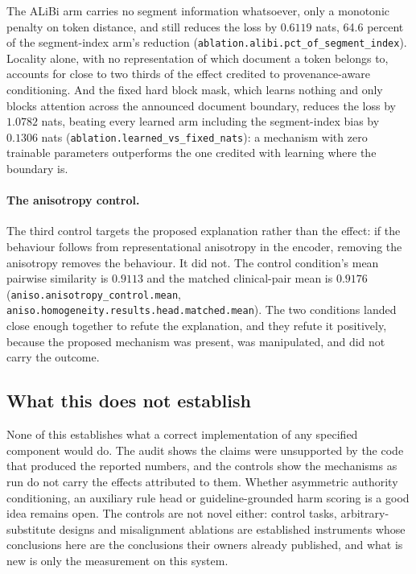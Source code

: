 The ALiBi arm carries no segment information whatsoever, only a monotonic penalty on token
distance, and still reduces the loss by $0.6119$ nats, 64.6 percent of the segment-index arm's
reduction (\texttt{ablation.alibi.pct\_of\_segment\_index}). Locality alone, with no representation
of which document a token belongs to, accounts for close to two thirds of the effect credited to
provenance-aware conditioning. And the fixed hard block mask, which learns nothing and only blocks
attention across the announced document boundary, reduces the loss by $1.0782$ nats, beating every
learned arm including the segment-index bias by $0.1306$ nats
(\texttt{ablation.learned\_vs\_fixed\_nats}): a mechanism with zero trainable parameters outperforms
the one credited with learning where the boundary is.

\paragraph{The anisotropy control.} The third control targets the proposed
explanation rather than the effect: if the behaviour follows from
representational anisotropy in the encoder, removing the anisotropy removes the
behaviour. It did not. The control condition's mean pairwise similarity is
$0.9113$ and the matched clinical-pair mean is $0.9176$
(\texttt{aniso.anisotropy\_control.mean},
\texttt{aniso.homogeneity.results.head.matched.mean}). The two conditions
landed close enough together to refute the explanation, and they refute it
positively, because the proposed mechanism
was present, was manipulated, and did not carry the outcome.

\subsection{What this does not establish}

None of this establishes what a correct implementation of any specified component
would do. The audit shows the claims were unsupported by the code that produced
the reported numbers, and the controls show the mechanisms as run do not carry
the effects attributed to them. Whether asymmetric authority conditioning, an
auxiliary rule head or guideline-grounded harm scoring is a good idea remains
open. The controls are not novel either: control tasks, arbitrary-substitute
designs and misalignment ablations are established instruments whose conclusions
here are the conclusions their owners already published, and what is new is only
the measurement on this system.


